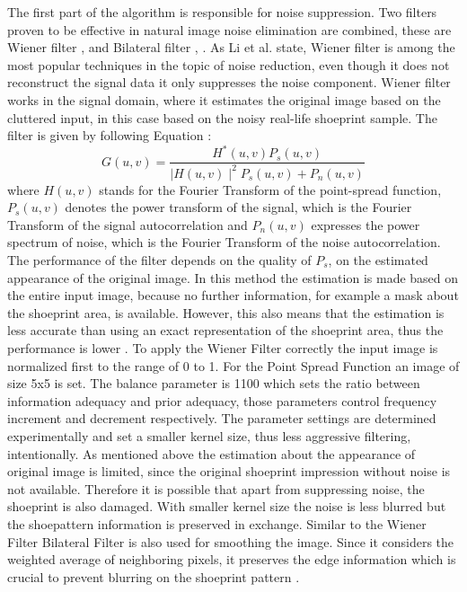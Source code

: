 \documentclass[draft,final]{vutinfth} %
\begin{document}
\par
The first part of the algorithm is responsible for noise suppression.
Two filters proven to be effective in natural image noise elimination are combined, these are Wiener filter \cite{li2014rapid}, \cite{chatterjee2011patch} and Bilateral filter \cite{zhang2016simultaneous}, \cite{huang2013self}.
As Li et al. \cite{li2014rapid} state, Wiener filter is among the most popular techniques in the topic of noise reduction, even though it does not reconstruct the signal data it only suppresses the noise component.
Wiener filter works in the signal domain, where it estimates the original image based on the cluttered input, in this case based on the noisy real-life shoeprint sample. 
The filter is given by following Equation \cite{Win}:
\[ G(u, v) = \frac{H^*(u,v) P_s(u, v)}{\mid H(u,v)\mid ^2 P_s (u, v) + P_n (u, v)}  \]
where $H(u,v)$ stands for the Fourier Transform of the point-spread function, $P_s (u,v)$ denotes the power transform of the signal, which is the Fourier Transform of the signal autocorrelation and $P_n(u,v)$ expresses the power spectrum of noise, which is the Fourier Transform of the noise autocorrelation.
The performance of the filter depends on the quality of $P_s$, on the estimated appearance of the original image.
In this method the estimation is made based on the entire input image, because no further information, for example a mask about the shoeprint  area, is available.
However, this also means that the estimation is less accurate than using an exact representation of the shoeprint area, thus the performance is lower \cite{chatterjee2011patch}.
To apply the Wiener Filter correctly the input image is normalized first to the range of 0 to 1.
For the Point Spread Function an image of size 5x5 is set.
The balance parameter is 1100 which sets the ratio between information adequacy and prior adequacy, those parameters control frequency increment and decrement respectively.
The parameter settings are determined experimentally and set a smaller kernel size, thus less aggressive filtering, intentionally.
As mentioned above the estimation about the appearance of original image is limited, since the original shoeprint impression without noise is not available.
Therefore it is possible that apart from suppressing noise, the shoeprint is also damaged.
With smaller kernel size the noise is less blurred but the shoepattern information is preserved in exchange.
Similar to the Wiener Filter Bilateral Filter is also used for smoothing the image.
Since it considers the weighted average of neighboring pixels, it preserves the edge information which is crucial to prevent blurring on the shoeprint pattern \cite{elad2002origin}. 
\end{document}
